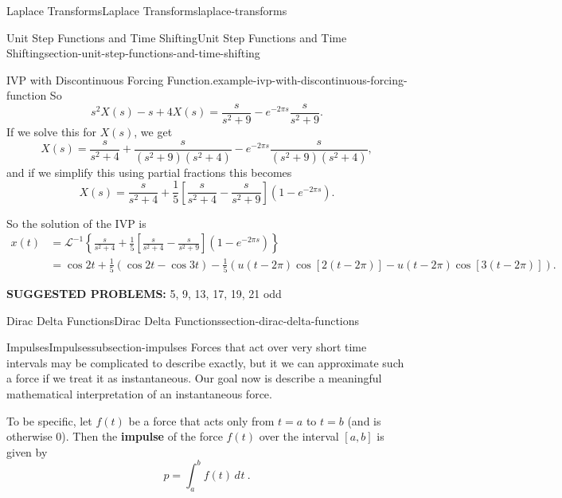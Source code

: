 \documentclass[oneside,10pt,]{book}
\newcommand{\terminology}[1]{\textbf{#1}}
\numberwithin{equation}{section}
\newcommand{\Int}[2]{\int_{#1}^{#2}}
\newcommand{\iLaplace}[1]{\mathcal{L}^{-1}\left\{#1\right\}}
\newcommand{\dd}[2][]{\, d^{#1} #2\ }
\newcommand{\brackets}[1]{\left[ #1 \right]}
\newcommand{\parens}[1]{\left( #1 \right)}
\newcommand{\amp}{&}
\begin{document}
\begin{chapterptx}{Laplace Transforms}{}{Laplace Transforms}{}{}{laplace-transforms}
\begin{sectionptx}{Unit Step Functions and Time Shifting}{}{Unit Step Functions and Time Shifting}{}{}{section-unit-step-functions-and-time-shifting}
\begin{example}{IVP with Discontinuous Forcing Function.}{example-ivp-with-discontinuous-forcing-function}
So%
\begin{equation*}
s^{2}X(s) - s + 4X(s) = \frac{s}{s^{2}+9} - e^{-2\pi s}\frac{s}{s^{2}+9}.
\end{equation*}
If we solve this for \(X(s)\), we get%
\begin{equation*}
X(s) = \frac{s}{s^{2}+4} + \frac{s}{(s^{2}+9)(s^{2}+4)} - e^{-2\pi s}\frac{s}{(s^{2}+9)(s^{2}+4)},
\end{equation*}
and if we simplify this using partial fractions this becomes%
\begin{equation*}
X(s) = \frac{s}{s^{2}+4} + \frac{1}{5}\brackets{\frac{s}{s^{2}+4} - \frac{s}{s^{2}+9}}\parens{1-e^{-2\pi s}}.
\end{equation*}
%
\par
\hypertarget{p-529}{}%
So the solution of the IVP is%
\begin{align*}
x(t) \amp= \iLaplace{\frac{s}{s^{2}+4} + \frac{1}{5}\brackets{\frac{s}{s^{2}+4} - \frac{s}{s^{2}+9}}\parens{1-e^{-2\pi s}}}\\
\amp= \cos2t + \frac{1}{5}\parens{\cos2t-\cos3t} - \frac{1}{5}\parens{u(t-2\pi)\cos[2(t-2\pi)] - u(t-2\pi)\cos[3(t-2\pi)]}\text{.}
\end{align*}
%
\end{example}
\terminology{SUGGESTED PROBLEMS:} 5, 9, 13, 17, 19, 21 odd\end{sectionptx}
%
%
\typeout{************************************************}
\typeout{************************************************}
%
\begin{sectionptx}{Dirac Delta Functions}{}{Dirac Delta Functions}{}{}{section-dirac-delta-functions}
%
%
\typeout{************************************************}
\typeout{************************************************}
%
\begin{subsectionptx}{Impulses}{}{Impulses}{}{}{subsection-impulses}
\hypertarget{p-530}{}%
Forces that act over very short time intervals may be complicated to describe exactly, but it we can approximate such a force if we treat it as instantaneous. Our goal now is describe a meaningful mathematical interpretation of an instantaneous force.%
\par
\hypertarget{p-531}{}%
To be specific, let \(f(t)\) be a force that acts only from \(t=a\) to \(t=b\) (and is otherwise \(0\)). Then the \terminology{impulse} of the force \(f(t)\) over the interval \([a,b]\) is given by%
\begin{equation*}
p = \Int{a}{b}f(t)\dd{t}.

\end{equation*}
\end{subsectionptx}
\end{sectionptx}
\end{chapterptx}
\end{document}
